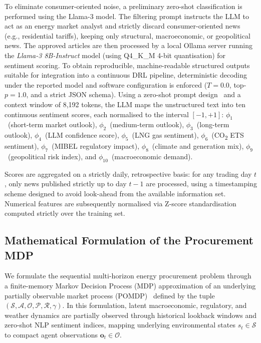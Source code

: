 To eliminate consumer-oriented noise, a preliminary zero-shot classification is performed using the Llama-3 model. The filtering prompt instructs the LLM to act as an energy market analyst and strictly discard consumer-oriented news (e.g., residential tariffs), keeping only structural, macroeconomic, or geopolitical news.
The approved articles are then processed by a local Ollama server running the \textit{Llama-3 8B-Instruct} model (using Q4\_K\_M 4-bit quantisation) for sentiment scoring. To obtain reproducible, machine-readable structured outputs suitable for integration into a continuous DRL pipeline, deterministic decoding under the reported model and software configuration is enforced ($T=0.0$, top-$p = 1.0$, and a strict JSON schema). Using a zero-shot prompt design~\cite{yin2019benchmarking} and a context window of 8,192 tokens, the LLM maps the unstructured text into ten continuous sentiment scores, each normalised to the interval $[-1,+1]$:
$\phi_1$~(short-term market outlook),
$\phi_2$~(medium-term outlook),
$\phi_3$~(long-term outlook),
$\phi_4$~(LLM confidence score),
$\phi_5$~(LNG gas sentiment),
$\phi_6$~(CO\textsubscript{2} ETS sentiment),
$\phi_7$~(MIBEL regulatory impact),
$\phi_8$~(climate and generation mix),
$\phi_9$~(geopolitical risk index), and
$\phi_{10}$~(macroeconomic demand).

Scores are aggregated on a strictly daily, retrospective basis: for any trading day $t$, only news published strictly up to day $t-1$ are processed, using a timestamping scheme designed to avoid look-ahead from the available information set. Numerical features are subsequently normalised via Z-score standardisation computed strictly over the training set.

\subsection{Mathematical Formulation of the Procurement MDP}
\label{subsec:mdp}

We formulate the sequential multi-horizon energy procurement problem through a finite-memory Markov Decision Process (MDP) approximation of an underlying partially observable market process (POMDP)~\cite{puterman1994mdp} defined by the tuple $(\mathcal{S}, \mathcal{A}, \mathcal{O}, \mathcal{P}, \mathcal{R}, \gamma)$. In this formulation, latent macroeconomic, regulatory, and weather dynamics are partially observed through historical lookback windows and zero-shot NLP sentiment indices, mapping underlying environmental states $s_t \in \mathcal{S}$ to compact agent observations $\mathbf{o}_t \in \mathcal{O}$.

